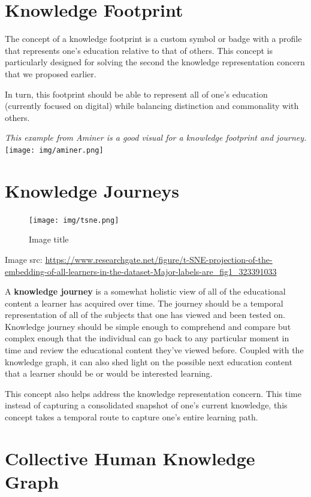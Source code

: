 \documentclass{acm_proc_article-sp}
\begin{document}
\section{Knowledge Footprint}\label{knowledge-footprint}

The concept of a knowledge footprint is a custom symbol or badge with a
profile that represents one's education relative to that of others. This
concept is particularly designed for solving the second the knowledge
representation concern that we proposed earlier.

In turn, this footprint should be able to represent all of one's
education (currently focused on digital) while balancing distinction and
commonality with others.

\emph{This example from Aminer is a good visual for a knowledge
footprint and journey.} \texttt{[image: img/aminer.png]}

\section{Knowledge Journeys}\label{knowledge-journeys}

\begin{figure}
\centering
\texttt{[image: img/tsne.png]}
\caption{Image title}
\end{figure}

Image src:
\url{https://www.researchgate.net/figure/t-SNE-projection-of-the-embedding-of-all-learners-in-the-dataset-Major-labels-are_fig1_323391033}

A \textbf{knowledge journey} is a somewhat holistic view of all of the
educational content a learner has acquired over time. The journey should
be a temporal representation of all of the subjects that one has viewed
and been tested on. Knowledge journey should be simple enough to
comprehend and compare but complex enough that the individual can go
back to any particular moment in time and review the educational content
they've viewed before. Coupled with the knowledge graph, it can also
shed light on the possible next education content that a learner should
be or would be interested learning.

This concept also helps address the knowledge representation concern.
This time instead of capturing a consolidated snapshot of one's current
knowledge, this concept takes a temporal route to capture one's entire
learning path.

\section{Collective Human Knowledge
Graph}\label{collective-human-knowledge-graph}
\end{document}
